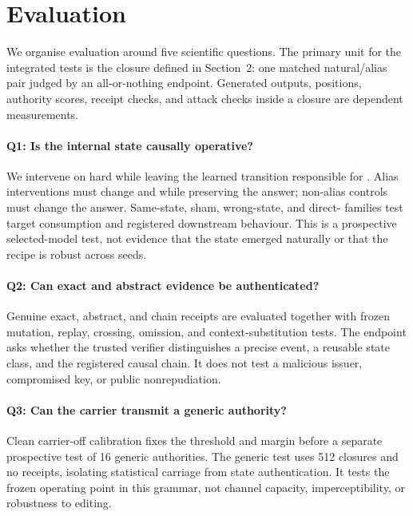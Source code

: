 \section{Evaluation}

We organise evaluation around five scientific questions. The primary unit for
the integrated tests is the closure defined in Section~2: one matched
natural/alias pair judged by an all-or-nothing endpoint. Generated outputs,
positions, authority scores, receipt checks, and attack checks inside a closure
are dependent measurements.

\paragraph{Q1: Is the internal state causally operative?}
We intervene on hard \ztwo{} while leaving the learned transition responsible
for \zthree{}. Alias interventions must change \ztwo{} and \zthree{} while
preserving the answer; non-alias controls must change the answer. Same-state,
sham, wrong-state, and direct-\zthree{} families test target consumption and
registered downstream behaviour. This is a prospective selected-model test,
not evidence that the state emerged naturally or that the recipe is robust
across seeds.

\paragraph{Q2: Can exact and abstract evidence be authenticated?}
Genuine exact, abstract, and chain receipts are evaluated together with frozen
mutation, replay, crossing, omission, and context-substitution tests. The
endpoint asks whether the trusted verifier distinguishes a precise event, a
reusable state class, and the registered causal chain. It does not test a
malicious issuer, compromised key, or public nonrepudiation.

\paragraph{Q3: Can the carrier transmit a generic authority?}
Clean carrier-off calibration fixes the threshold and margin before a separate
prospective test of 16 generic authorities. The generic test uses 512 closures
and no receipts, isolating statistical carriage from state authentication. It
tests the frozen operating point in this grammar, not channel capacity,
imperceptibility, or robustness to editing.

